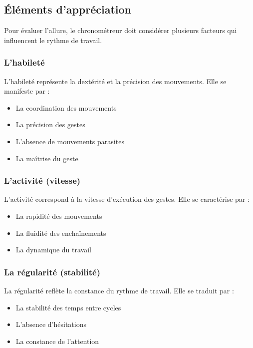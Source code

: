 \documentclass[a4paper,12pt]{article}
\begin{document}
\subsection{Éléments d'appréciation}

Pour évaluer l'allure, le chronométreur doit considérer plusieurs facteurs qui influencent le rythme de travail.

\subsubsection{L'habileté}

L'habileté représente la dextérité et la précision des mouvements. Elle se manifeste par :

\begin{itemize}
    \item La coordination des mouvements
    \item La précision des gestes
    \item L'absence de mouvements parasites
    \item La maîtrise du geste
\end{itemize}

\subsubsection{L'activité (vitesse)}

L'activité correspond à la vitesse d'exécution des gestes. Elle se caractérise par :

\begin{itemize}
    \item La rapidité des mouvements
    \item La fluidité des enchaînements
    \item La dynamique du travail
\end{itemize}

\subsubsection{La régularité (stabilité)}

La régularité reflète la constance du rythme de travail. Elle se traduit par :

\begin{itemize}
    \item La stabilité des temps entre cycles
    \item L'absence d'hésitations
    \item La constance de l'attention
\end{itemize}
\end{document}
